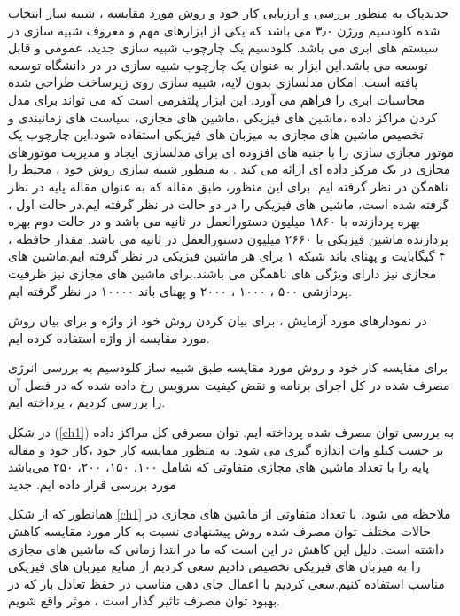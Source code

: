 ‌جدید‌پاک
  به منظور بررسی و ارزیابی کار خود و روش مورد مقایسه ، شبیه ساز انتخاب شده کلودسیم
   ورژن
۳٫۰
         می باشد که یکی از ابزارهای مهم و معروف شبیه سازی در سیستم های ابری می باشد. کلودسیم یک چارچوب شبیه سازی جدید، عمومی و قابل توسعه می باشد.این ابزار به عنوان یک چارچوب شبیه سازی در در دانشگاه 
         توسعه یافته است. امکان مدلسازی بدون لایه، شبیه سازی روی زیرساخت طراحی شده محاسبات ابری را فراهم می آورد. این ابزار پلتفرمی است که می تواند برای مدل کردن مراکز داده ،ماشین های فیزیکی ،ماشین های مجازی،  سیاست های زمانبندی و تخصیص ماشین های مجازی به میزبان های فیزیکی استفاده شود.این چارچوب یک موتور مجازی سازی را با جنبه های افزوده ای برای مدلسازی ایجاد و مدیریت موتورهای مجازی در یک مرکز داده ای ارائه می کند 
\cite{num17}.
         به منظور شبیه سازی روش خود ، محیط را ناهمگن در نظر گرفته ایم. برای این منظور، طبق مقاله 
\cite{num15}
          که به عنوان مقاله پایه در نظر گرفته شده است، ماشین های فیزیکی را در  دو حالت در نظر گرفته ایم.در حالت اول ، بهره پردازنده با
           ۱۸۶۰ 
          میلیون دستورالعمل در ثانیه
            می باشد و در حالت دوم بهره پردازنده ماشین فیزیکی با 
          ۲۶۶۰ 
          میلیون دستورالعمل در ثانیه می باشد. مقدار حافظه
            ،
             ۴
           گیگابایت و پهنای باند شبکه 
           ۱
           برای هر ماشین فیزیکی در نظر گرفته ایم.ماشین های مجازی نیز دارای ویژگی های ناهمگن می باشند.برای ماشین های مجازی نیز ظرفیت پردازشی
            ۵۰۰
             ، 
             ۱۰۰۰
             ، 
             ۲۰۰۰ 
           و پهنای باند
            ۱۰۰۰۰ 
           در نظر گرفته ایم.
 
در نمودارهای مورد آزمایش ، برای بیان کردن روش خود از واژه
و برای بیان روش مورد مقایسه از واژه
استفاده کرده ایم. 

برای مقایسه کار خود و روش مورد مقایسه طبق شبیه ساز کلودسیم به بررسی انرژی مصرف شده در کل اجرای برنامه و نقض کیفیت سرویس رخ داده شده که در فصل
 آن را بررسی کردیم ، پرداخته ایم.

در شکل
(\ref{ch1})
به بررسی توان مصرف شده پرداخته ایم. توان مصرفی کل مراکز داده بر حسب کیلو وات اندازه گیری می شود. به منظور مقایسه کار خود ،کار خود و مقاله پایه را با تعداد ماشین های مجازی متفاوتی که شامل ۱۰۰، ۱۵۰، ۲۰۰، ۲۵۰  می‌باشد مورد بررسی قرار داده ایم.
‌جدید
 
  همانطور که از شکل
 \ref{ch1}
  ملاحظه می شود، با تعداد متفاوتی از ماشین های مجازی در حالات مختلف توان مصرف شده روش پیشنهادی نسبت به کار مورد مقایسه کاهش داشته است. دلیل این کاهش در این است که ما در ابتدا زمانی که ماشین های مجازی را به میزبان های فیزیکی تخصیص دادیم سعی کردیم از منابع میزبان های فیزیکی مناسب استفاده کنیم.سعی کردیم با اعمال جای دهی مناسب در حفظ تعادل بار که در بهبود توان مصرف تاثیر گذار است  ، موثر واقع شویم.

